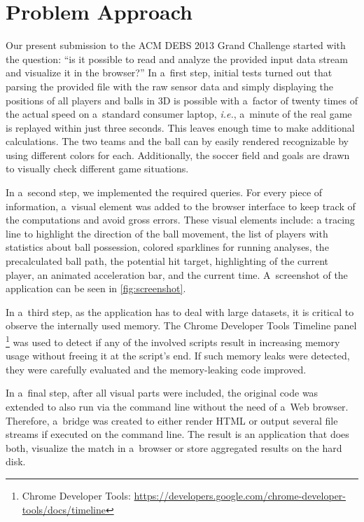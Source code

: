 \documentclass{sig-alternate}
\newcommand{\inlinelistingsize}{\fontsize{8pt}{11pt}}
\let\oldurl\url
\renewcommand{\url}[1]{\inlinelistingsize\oldurl{#1}}
\begin{document}
\section{Problem Approach}
\label{sec:methodology}

Our present submission to the ACM DEBS 2013 Grand Challenge
started with the question: ``is it possible to read and analyze
the provided input data stream and visualize it in the browser?''
In a~first step, initial tests turned out that
parsing the provided file with the raw sensor data
and simply displaying the positions of all players
and balls in 3D is possible with a~factor of twenty times of the actual speed on a~standard consumer laptop,
\emph{i.e.}, a~minute of the real game is replayed
within just three seconds.
This leaves enough time to make additional calculations.
The two teams and the ball can by easily rendered recognizable
by using different colors for each.
Additionally, the soccer field and goals are drawn
to visually check different game situations.

In a~second step, we implemented the required queries.
For every piece of information, a~visual element was added
to the browser interface to keep track of the computations
and avoid gross errors.
These visual elements include:
a tracing line to highlight the direction of the ball movement,  
the list of players with statistics about ball possession,
colored sparklines for running analyses,
the precalculated ball path, the potential hit target,
highlighting of the current player,
an animated acceleration bar,
and the current time.
A~screenshot of the application can be seen in
\autoref{fig:screenshot}.

In a~third step, as the application has to deal with large datasets,
it is critical to observe the internally used memory.
The Chrome Developer Tools Timeline panel%
\footnote{Chrome Developer Tools: \url{https://developers.google.com/chrome-developer-tools/docs/timeline}}
was used
to detect if any of the involved scripts
result in increasing memory usage without freeing it at the script's end.
If such memory leaks were detected, they were carefully evaluated and the memory-leaking code improved.

In a~final step, after all visual parts were included,
the original code was extended to also run
via the command line without the need of a~Web browser.
Therefore, a~bridge was created to either render HTML
or output several file streams if executed on the command line.
The result is an application that does both,
visualize the match in a~browser or store aggregated results
on the hard disk.
\end{document}
